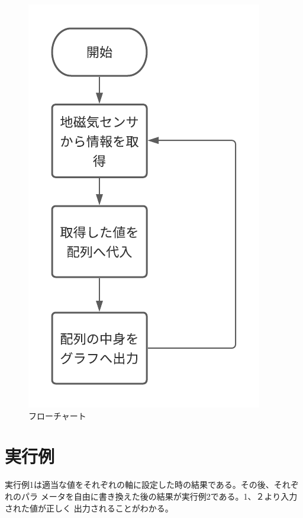 \documentclass[dvipdfmx,autodetect-engine,titlepage]{jsarticle}
\begin{document}
\begin{figure}[h]
    \centering
    \includegraphics[scale=0.4]{flowchart.png}
    \caption{フローチャート}
\end{figure}



\section{実行例}

実行例1は適当な値をそれぞれの軸に設定した時の結果である。その後、それぞれのパラ
メータを自由に書き換えた後の結果が実行例2である。1、２より入力された値が正しく
出力されることがわかる。
\end{document}

